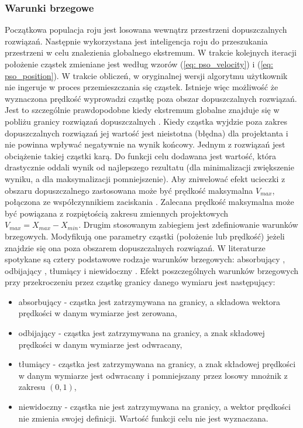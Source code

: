 %
\subsubsection{Warunki brzegowe}
Początkowa populacja roju jest losowana wewnątrz przestrzeni dopuszczalnych rozwiązań. Następnie wykorzystana jest inteligencja roju do przeszukania przestrzeni w celu znalezienia globalnego ekstremum. W trakcie kolejnych iteracji położenie cząstek zmieniane jest według wzorów (\ref{eq: pso_velocity}) i (\ref{eq: pso_position}). W trakcie obliczeń, w oryginalnej wersji algorytmu użytkownik nie ingeruje w proces przemieszczania się cząstek. Istnieje więc możliwość że wyznaczona prędkość wyprowadzi cząstkę poza obszar dopuszczalnych rozwiązań. Jest to szczególnie prawdopodobne kiedy ekstremum globalne znajduje się w pobliżu granicy rozwiązań dopuszczalnych \parencite{Xu2007}. Kiedy cząstka wyjdzie poza zakres dopuszczalnych rozwiązań jej wartość jest nieistotna (błędna) dla projektanta i nie powinna wpływać negatywnie na wynik końcowy. Jednym z rozwiązań jest obciążenie takiej cząstki karą. Do funkcji celu dodawana jest wartość, która drastycznie oddali wynik od najlepszego rezultatu (dla minimalizacji zwiększenie wyniku, a dla maksymalizacji pomniejszenie). 
Aby zniwelować efekt ucieczki z obszaru dopuszczalnego zastosowana może być prędkość maksymalna $V_{max}$, połączona ze współczynnikiem zaciskania \parencite{Eberhart2001a}. Zalecana prędkość maksymalna może być powiązana z rozpiętością zakresu zmiennych projektowych $V_{max}=X_{max}-X_{min}$. Drugim stosowanym zabiegiem jest zdefiniowanie warunków brzegowych. Modyfikują one parametry cząstki (położenie lub prędkość) jeżeli znajdzie się ona poza obszarem dopuszczalnych rozwiązań. W literaturze spotykane są cztery podstawowe rodzaje warunków brzegowych: absorbujący , odbijający , tłumiący  i niewidoczny  \parencite{Robinson2004,Huang2005}. Efekt poszczególnych warunków brzegowych przy przekroczeniu przez cząstkę granicy danego wymiaru jest następujący:
\begin{itemize}[noitemsep]
	\item absorbujący - cząstka jest zatrzymywana na granicy, a składowa wektora prędkości w danym wymiarze jest zerowana,
	\item odbijający -  cząstka jest zatrzymywana na granicy, a znak składowej prędkości w danym wymiarze jest odwracany,
	\item tłumiący - cząstka jest zatrzymywana na granicy, a znak składowej prędkości w danym wymiarze jest odwracany i pomniejszany przez losowy mnożnik z zakresu $(0,1)$,
	\item niewidoczny - cząstka nie jest zatrzymywana na granicy, a wektor prędkości nie zmienia swojej definicji. Wartość funkcji celu nie jest wyznaczana.
\end{itemize} 
